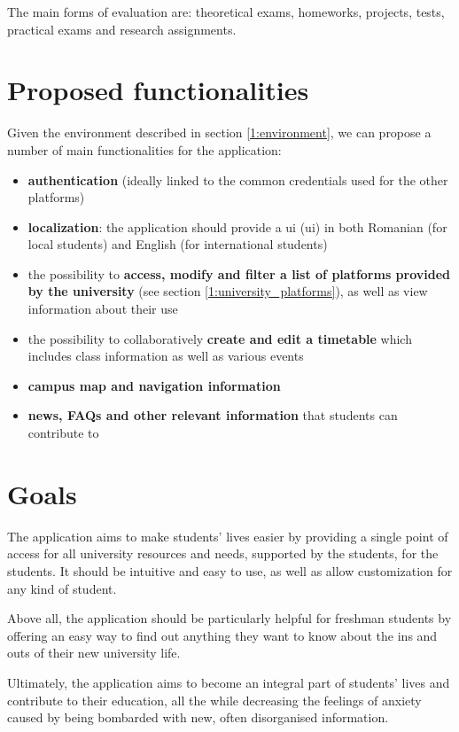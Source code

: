     The main forms of evaluation are: theoretical exams, homeworks, projects, tests, practical exams and research assignments.
        
\section{Proposed functionalities} \label{1:functionalities}

    Given the environment described in section \ref{1:environment}, we can propose a number of main functionalities for the application:
    
    \begin{itemize}
        \item \textbf{authentication} (ideally linked to the common credentials used for the other platforms)
        \item \textbf{localization}: the application should provide a \acrshort{ui} (\acrlong{ui}) in both Romanian (for local students) and English (for international students)
        \item the possibility to \textbf{access, modify and filter a list of platforms provided by the university} (see section \ref{1:university_platforms}), as well as view information about their use
        \item the possibility to collaboratively \textbf{create and edit a timetable} which includes class information as well as various events
        \item \textbf{campus map and navigation information}
        \item \textbf{news, FAQs and other relevant information} that students can contribute to
    \end{itemize}

\section{Goals} \label{1:goals}

The application aims to make students' lives easier by providing a single point of access for all university resources and needs, supported by the students, for the students. It should be intuitive and easy to use, as well as allow customization for any kind of student.

Above all, the application should be particularly helpful for freshman students by offering an easy way to find out anything they want to know about the ins and outs of their new university life.

Ultimately, the application aims to become an integral part of students' lives and contribute to their education, all the while decreasing the feelings of anxiety caused by being bombarded with new, often disorganised information.